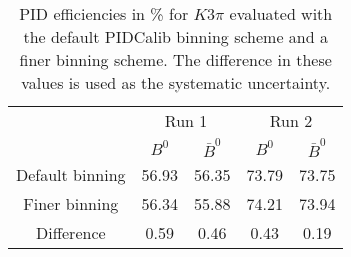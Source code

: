 \begin{table}
    \centering
    \begin{tabular}{ccccc}
    \toprule
& \multicolumn{2}{c}{Run 1} & \multicolumn{2}{c}{Run 2}\\
& $B^0$ & $\bar{B}^0$ & $B^0$ & $\bar{B}^0$\\
    \midrule
Default binning & 56.93 & 56.35 & 73.79 & 73.75\\
Finer binning & 56.34 & 55.88 & 74.21 & 73.94\\
Difference & 0.59 & 0.46 & 0.43 & 0.19\\
    \bottomrule
    \end{tabular}
    \caption{PID efficiencies in \% for $K3\pi$ evaluated with the default PIDCalib binning scheme and a finer binning scheme. The difference in these values is used as the systematic uncertainty.}
\label{tab:final_PID_Kpipipi}
\end{table}
